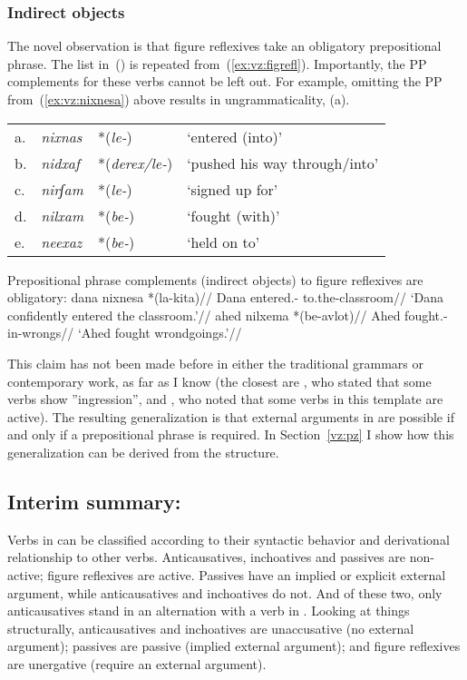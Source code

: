 	\subsubsection{Indirect objects} \label{vz:tnif:figrefl:pp}
The novel observation is that figure reflexives take an obligatory prepositional phrase. The list in~(\nextx) is repeated from~(\ref{ex:vz:figrefl}). Importantly, the PP complements for these verbs cannot be left out. For example, omitting the PP from~(\ref{ex:vz:nixnesa}) above results in ungrammaticality, (\anextx a).
\ex \begin{tabular}{l>{\em}lll}
	a.& nixnas &  *(\emph{le-}) & `entered (into)'\\
	b.& nidxaf & *(\emph{derex/le-})  & `pushed his way through/into' \\
	c.& nirʃam & *(\emph{le-})  & `signed up for' \\
	d.& nilxam & *(\emph{be-}) & `fought (with)' \\
	e.& neexaz & *(\emph{be-}) & `held on to' \\
    \end{tabular}
\xe

\pex Prepositional phrase complements (indirect objects) to figure reflexives are obligatory:
	\a \begingl
		\gla dana nixnesa *(la-kita)//
		\glb Dana entered.- to.the-classroom//
		\glft `Dana confidently entered the classroom.'//
	\endgl
	\a \begingl
		\gla ahed nilxema *(be-avlot)//
		\glb Ahed fought.- in-wrongs//
		\glft `Ahed fought wrondgoings.'//
	\endgl
\xe

This claim has not been made before in either the traditional grammars or contemporary work, as far as I know (the closest are \citealt[87]{berman78}, who stated that some verbs show ''ingression'', and \citealt{schwarzwald08}, who noted that some verbs in this template are active). The resulting generalization is that external arguments in {\tnif} are possible if and only if a prepositional phrase is required. In Section~\ref{vz:pz} I show how this generalization can be derived from the structure.

	\subsection{Interim summary: \tnif} \label{vz:tnif:sum}
Verbs in {\tnif} can be classified according to their syntactic behavior and derivational relationship to other verbs. Anticausatives, inchoatives and passives are non-active; figure reflexives are active. Passives have an implied or explicit external argument, while anticausatives and inchoatives do not. And of these two, only anticausatives stand in an alternation with a verb in {\tkal}. Looking at things structurally, anticausatives and inchoatives are unaccusative (no external argument); passives are passive (implied external argument); and figure reflexives are unergative (require an external argument).


